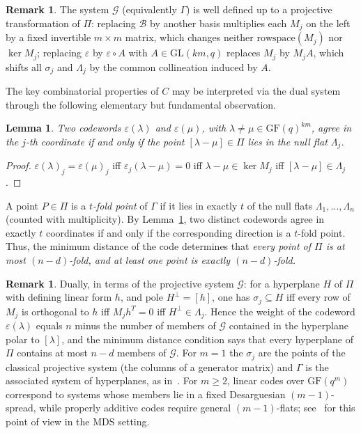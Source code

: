 \documentclass[12pt]{article}
\newtheorem{lem}[thm]{Lemma}
\theoremstyle{definition}
\newtheorem{rem}[thm]{Remark}
\numberwithin{equation}{section}
\newcommand{\G}{\mathcal{G}}
\newcommand{\la}{\lambda}
\newcommand{\GF}[1]{\mathrm{GF}(#1)}
\begin{document}
\begin{rem}\label{rem:welldef}
The system $\G$ (equivalently $\Gamma$) is well defined up to a projective transformation of $\Pi$: replacing $\mathcal{B}$ by another basis multiplies each $M_j$ on the left by a fixed invertible $m\times m$ matrix, which changes neither $\mathrm{rowspace}(M_j)$ nor $\ker M_j$; replacing $\varepsilon$ by $\varepsilon\circ A$ with $A\in\mathrm{GL}(km,q)$ replaces $M_j$ by $M_jA$, which shifts all  $\sigma_j$ and $\Lambda_j$ by the common collineation induced by $A$.
\end{rem}

The key combinatorial properties of $C$ may be interpreted via the dual system through the following elementary but fundamental observation.

\begin{lem}\label{lem:agree}
Two codewords $\varepsilon(\la)$ and $\varepsilon(\mu)$, with $\la\neq\mu\in\GF{q}^{km}$, agree in the $j$-th coordinate if and only if the point $[\la-\mu]\in\Pi$ lies in the null flat $\Lambda_j$.
\end{lem}
\begin{proof}
$\varepsilon(\la)_j=\varepsilon(\mu)_j$ iff $\varepsilon_j(\la-\mu)=0$ iff $\la-\mu\in\ker M_j$ iff $[\la-\mu]\in \Lambda_j$.
\end{proof}

A point $P\in\Pi$ is a \textit{$t$-fold point} of $\Gamma$ if it lies in exactly $t$ of the null flats $\Lambda_1,\ldots,\Lambda_n$ (counted with multiplicity).  By Lemma~\ref{lem:agree}, two distinct codewords agree in exactly $t$ coordinates if and only if the corresponding direction is a $t$-fold point.  Thus, the minimum distance of the code determines that \textit{every point of $\Pi$ is at most $(n-d)$-fold, and at least one point is exactly $(n-d)$-fold.}

\begin{rem}\label{rem:duality}
Dually, in terms of the projective system $\G$: for a hyperplane $H$ of $\Pi$ with defining linear form $h$, and pole $H^\perp=[h]$, one has $\sigma_j\subseteq H$ iff every row of $M_j$ is orthogonal to $h$ iff $M_jh^T=0$ iff $H^\perp\in \Lambda_j$.  Hence the weight of the codeword $\varepsilon(\la)$ equals $n$ minus the number of members of $\G$ contained in the hyperplane polar to $[\la]$, and the minimum distance condition says that every hyperplane of $\Pi$ contains at most $n-d$ members of $\G$.  For $m=1$ the $\sigma_j$ are the points of the classical projective system (the columns of a generator matrix) and $\Gamma$ is the associated system of hyperplanes, as in~\cite{MR2529622}.  For $m\ge2$, linear codes over $\GF{q^m}$ correspond to systems whose members lie in a fixed Desarguesian $(m-1)$-spread, while properly additive codes require general $(m-1)$-flats; see~\cite{BGL22,AdBall} for this point of view in the MDS setting.
\end{rem}
\end{document}
